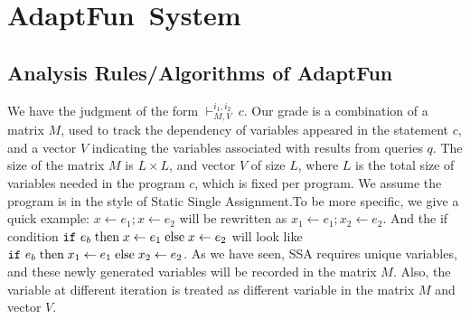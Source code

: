 \documentclass[a4paper,11pt]{article}
\newcommand{\THESYSTEM}{\textsf{AdaptFun}}
\begin{document}
%
%
%
\section{\THESYSTEM~System}
\subsection{Analysis Rules/Algorithms of \THESYSTEM}

We have the judgment of the form $\vdash^{i_1, i_2}_{M,V} ~ c  $.  Our grade is a combination of a matrix $M$, used to track the dependency of variables appeared in the statement $c$, and a vector $V$ indicating the variables associated with results from queries $q$. The size of the matrix $M$ is $L \times L$, and vector $V$ of size $L$, where $L$ is the total size of variables needed in the program $c$, which is fixed per program. We assume the program is in the style of Static Single Assignment.To be more specific, we give a quick example: $x \leftarrow e_1; x \leftarrow e_2 $ will be rewritten as $ x_1 \leftarrow e_1; x_2 \leftarrow e_2$. And the if condition $ \mathtt{if} ~ e_b \mbox{\;then\;} x \leftarrow e_1 \mbox{\;else\;} x \leftarrow e_2  $ will look like $ \mathtt{if} ~ e_b \mbox{\;then\;} x_1 \leftarrow e_1 \mbox{\;else\;} x_2 \leftarrow e_2  $. As we have seen, SSA requires unique variables, and these newly generated variables will be recorded in the matrix $M$.  Also, the variable at different iteration is treated as different variable in the matrix $M$ and vector $V$.
\end{document}
